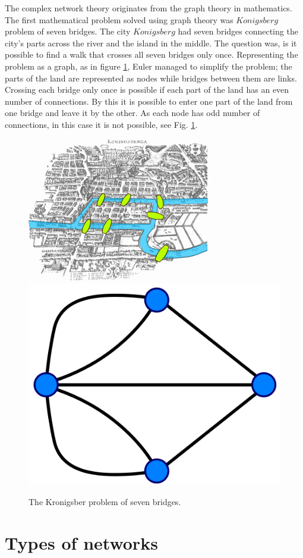 The complex network theory originates from the graph theory in mathematics. %
The first mathematical problem solved using graph theory was $Konigsberg$ problem of seven bridges. The city $Konigsberg$ had seven bridges connecting the city's parts across the river and the island in the middle. The question was, is it possible to find a walk that crosses all seven bridges only once. Representing the problem as a graph, as in figure \ref{fig:Krgraph}, Euler managed to simplify the problem; the parts of the land are represented as nodes while bridges between them are links. Crossing each bridge only once is possible if each part of the land has an even number of connections. By this it is possible to enter one part of the land from one bridge and leave it by the other. As each node has odd number of connections, in this case it is not possible, see Fig. \ref{fig:Krgraph}.

\begin{figure}[h!]
	\centering
	\includegraphics[width=0.3\linewidth]{Figures/Konigsberg_bridges.png} \hspace{2cm}
	\includegraphics[width=0.3\linewidth]{Figures/Konigsberg_graph.png}
	\caption{The Kronigsber problem of seven bridges.}
	\label{fig:Krgraph}
\end{figure}

\section{Types of networks}

